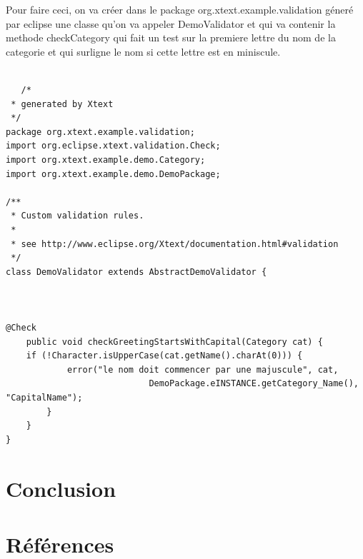 \documentclass{article}
\begin{document}
Pour faire ceci, on va créer dans le package org.xtext.example.validation géneré par eclipse une classe qu'on va appeler DemoValidator et qui va contenir la methode checkCategory qui fait un test sur la premiere lettre du nom de la categorie et qui surligne le nom si cette lettre est en miniscule.


\begin{verbatim}

   /*
 * generated by Xtext
 */
package org.xtext.example.validation;
import org.eclipse.xtext.validation.Check;
import org.xtext.example.demo.Category;
import org.xtext.example.demo.DemoPackage;

/**
 * Custom validation rules. 
 *
 * see http://www.eclipse.org/Xtext/documentation.html#validation
 */
class DemoValidator extends AbstractDemoValidator {



@Check
	public void checkGreetingStartsWithCapital(Category cat) {
	if (!Character.isUpperCase(cat.getName().charAt(0))) {
			error("le nom doit commencer par une majuscule", cat,
							DemoPackage.eINSTANCE.getCategory_Name(), "CapitalName");
		}
	}
}
\end{verbatim}

\newpage
\section{Conclusion}
\label{hints}

\newpage
\section{Références}
\label{hints}



\end{document}
